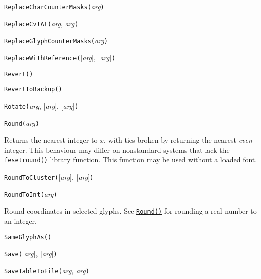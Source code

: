 
\noindent\texttt{ReplaceCharCounterMasks(}\textit{arg}\texttt{)}


\noindent\texttt{ReplaceCvtAt(}\textit{arg}, \textit{arg}\texttt{)}


\noindent\texttt{ReplaceGlyphCounterMasks(}\textit{arg}\texttt{)}


\noindent\texttt{ReplaceWithReference(}[\textit{arg}], [\textit{arg}]\texttt{)}


\noindent\texttt{Revert(}\texttt{)}


\noindent\texttt{RevertToBackup(}\texttt{)}


\noindent\texttt{Rotate(}\textit{arg}, [\textit{arg}], [\textit{arg}]\texttt{)}


\noindent\texttt{Round(}\textit{arg}\texttt{)}

Returns the nearest integer to $x$, with ties broken by returning the
nearest \emph{even} integer.  This behaviour may differ on nonstandard
systems that lack the \texttt{fesetround()} library function.
This function may be used without a loaded font.


\noindent\texttt{RoundToCluster(}[\textit{arg}], [\textit{arg}]\texttt{)}


\noindent\texttt{RoundToInt(}\textit{arg}\texttt{)}

Round coordinates in selected glyphs.  See
\hyperref[func:Round]{\texttt{Round()}} for rounding a
real number to an integer.


\noindent\texttt{SameGlyphAs(}\texttt{)}


\noindent\texttt{Save(}[\textit{arg}], [\textit{arg}]\texttt{)}


\noindent\texttt{SaveTableToFile(}\textit{arg}, \textit{arg}\texttt{)}

